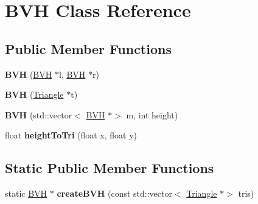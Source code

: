 \hypertarget{classBVH}{}\section{B\+VH Class Reference}
\label{classBVH}
\subsection*{Public Member Functions}
\begin{DoxyCompactItemize}
\item 
\mbox{\label{classBVH_aad5f857a15fbe4fc58c7ecdc38ed8e6c}} 
{\bfseries B\+VH} (\hyperlink{classBVH}{B\+VH} $\ast$l, \hyperlink{classBVH}{B\+VH} $\ast$r)
\item 
\mbox{\label{classBVH_aa937fa954ef0afb7918585383a1b7d45}} 
{\bfseries B\+VH} (\hyperlink{classTriangle}{Triangle} $\ast$t)
\item 
\mbox{\label{classBVH_a52aae90a6245e0d144bfb43cb118eb6e}} 
{\bfseries B\+VH} (std\+::vector$<$ \hyperlink{classBVH}{B\+VH} $\ast$$>$ m, int height)
\item 
\mbox{\label{classBVH_ad0c58e6a547f0cb238f23d1f50bb367a}} 
float {\bfseries height\+To\+Tri} (float x, float y)
\end{DoxyCompactItemize}
\subsection*{Static Public Member Functions}
\begin{DoxyCompactItemize}
\item 
\mbox{\label{classBVH_a039d56c9683671bf2526034d855ca53c}} 
static \hyperlink{classBVH}{B\+VH} $\ast$ {\bfseries create\+B\+VH} (const std\+::vector$<$ \hyperlink{classTriangle}{Triangle} $\ast$$>$ tris)
\end{DoxyCompactItemize}
